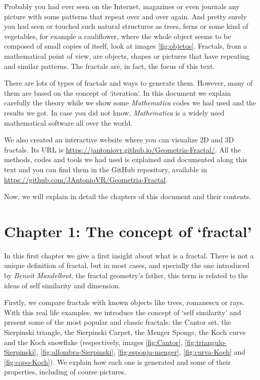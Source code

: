 
Probably you had ever seen on the Internet, magazines or even journals any picture with some patterns that repeat over and over again. And pretty surely you had seen or touched such natural structures as trees, ferns or some kind of vegetables, for example a cauliflower, where the whole object seems to be composed of small copies of itself, look at images \ref{fig:objetos}. Fractals, from a mathematical point of view, are objects, shapes or pictures that have repeating and similar patterns. The fractals are, in fact, the focus of this text.

There are lots of types of fractals and ways to generate them. However, many of them are based on the concept of `iteration'. In this document we explain carefully the theory while we show some \textit{Mathematica} codes we had used and the results we got. In case you did not know, \textit{Mathematica} is a widely used mathematical software all over the world. 

We also created an interactive website where you can visualize 2D and 3D fractals. Its URL is \url{https://jantoniovr.github.io/Geometria-Fractal/}. All the methods, codes and tools we had used is explained and documented along this text and you can find them in the GitHub repository, available in \url{https://github.com/JAntonioVR/Geometria-Fractal}.

Now, we will explain in detail the chapters of this document and their contents.

\section*{Chapter 1: The concept of `fractal'}

In this first chapter we give a first insight about what is a fractal. There is not a unique definition of fractal, but in most cases, and specially the one introduced by \textit{Benoit Mandelbrot}, the fractal geometry's father, this term is related to the ideas of self similarity and dimension. 

Firstly, we compare fractals with known objects like trees, romanescu or rays. With this real life examples, we introduce the concept of `self similarity' and present some of the most popular and classic fractals: the Cantor set, the Sierpinski triangle, the Sierpinski Carpet, the Menger Sponge, the Koch curve and the Koch snowflake (respectively, images \ref{fig:Cantor}, \ref{fig:triangulo-Sierpinski}, \ref{fig:alfombra-Sierpinski}, \ref{fig:esponja-menger}, \ref{fig:curva-Koch} and \ref{fig:copo-Koch}). We explain how each one is generated and some of their properties, including of course pictures.

